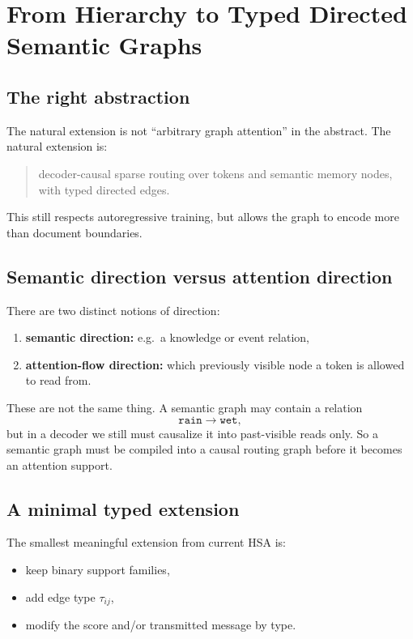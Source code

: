 \documentclass[11pt]{article}
\begin{document}
\section{From Hierarchy to Typed Directed Semantic Graphs}

\subsection{The right abstraction}

The natural extension is not ``arbitrary graph attention'' in the abstract. The
natural extension is:
\begin{quote}
decoder-causal sparse routing over tokens and semantic memory nodes, with typed
directed edges.
\end{quote}

This still respects autoregressive training, but allows the graph to encode
more than document boundaries.

\subsection{Semantic direction versus attention direction}

There are two distinct notions of direction:
\begin{enumerate}[leftmargin=1.5em]
    \item \textbf{semantic direction:} e.g.\ a knowledge or event relation,
    \item \textbf{attention-flow direction:} which previously visible node a
    token is allowed to read from.
\end{enumerate}

These are not the same thing. A semantic graph may contain a relation
\[
\texttt{rain} \to \texttt{wet},
\]
but in a decoder we still must causalize it into past-visible reads only. So a
semantic graph must be compiled into a causal routing graph before it becomes an
attention support.

\subsection{A minimal typed extension}

The smallest meaningful extension from current HSA is:
\begin{itemize}[leftmargin=1.5em]
    \item keep binary support families,
    \item add edge type $\tau_{ij}$,
    \item modify the score and/or transmitted message by type.
\end{itemize}
\end{document}
